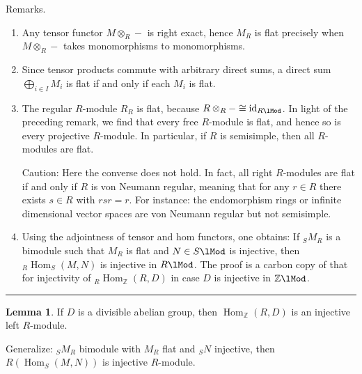 \documentclass[12pt]{article}
\newcommand{\sepline}{\rule{\textwidth}{0.4pt}}
\theoremstyle{definition}
\newtheorem{lemma}{Lemma}
\newcommand{\Z}{\mathbb{Z}}
\newcommand{\<}{\left\langle}
\renewcommand{\>}{\right\rangle}
\newcommand{\iso}{\cong}
\newcommand{\tensor}{\otimes}
\DeclareMathOperator{\Hom}{Hom}
\DeclareMathOperator{\id}{id}
\renewcommand{\_}[1]{{_{#1}}}
\begin{document}
Remarks.
\begin{enumerate}[(1)]
    \item Any tensor functor $M \tensor_R -$ is right exact, hence $M_R$ is flat precisely when $M \tensor_R -$ takes monomorphisms to monomorphisms.
    
    \item Since tensor products commute with arbitrary direct sums, a direct sum $\bigoplus_{i \in I} M_i$ is flat if and only if each $M_i$ is flat.
    
    \item The regular $R$-module $R_R$ is flat, because $R \tensor_R - \iso \id_{R\lMod}$.
    In light of the preceding remark, we find that every free $R$-module is flat, and hence so is every projective $R$-module.
    In particular, if $R$ is semisimple, then all $R$-modules are flat.

    Caution: Here the converse does not hold.
    In fact, all right $R$-modules are flat if and only if $R$ is von Neumann regular, meaning that for any $r \in R$ there exists $s \in R$ with $rsr = r$.
    For instance: the endomorphism rings or infinite dimensional vector spaces are von Neumann regular but not semisimple.

    \item Using the adjointness of tensor and hom functors, one obtains: If $\_SM_R$ is a bimodule such that $M_R$ is flat and $N \in S\lMod$ is injective, then $\_R\Hom_S(M, N)$ is injective in $R\lMod$.
    The proof is a carbon copy of that for injectivity of $\_R\Hom_\Z(R, D)$ in case $D$ is injective in $\Z\lMod$.
\end{enumerate}

\sepline

\begin{lemma}
    If $D$ is a divisible abelian group, then $\Hom_\Z(R, D)$ is an injective left $R$-module.

    Generalize: $\_SM_R$ bimodule with $M_R$ flat and $\_SN$ injective, then $R(\Hom_S(M, N))$ is injective $R$-module.
\end{lemma}
\end{document}
